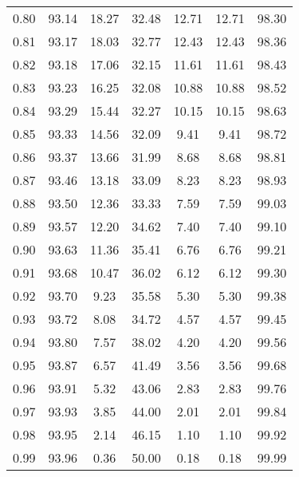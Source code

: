 \begin{tabular}{|c|c|c|c|c|c|c|}
      0.80 &     93.14 &     18.27 &      32.48 &   12.71 &      12.71 &         98.30 \\
      0.81 &     93.17 &     18.03 &      32.77 &   12.43 &      12.43 &         98.36 \\
      0.82 &     93.18 &     17.06 &      32.15 &   11.61 &      11.61 &         98.43 \\
      0.83 &     93.23 &     16.25 &      32.08 &   10.88 &      10.88 &         98.52 \\
      0.84 &     93.29 &     15.44 &      32.27 &   10.15 &      10.15 &         98.63 \\
      0.85 &     93.33 &     14.56 &      32.09 &    9.41 &       9.41 &         98.72 \\
      0.86 &     93.37 &     13.66 &      31.99 &    8.68 &       8.68 &         98.81 \\
      0.87 &     93.46 &     13.18 &      33.09 &    8.23 &       8.23 &         98.93 \\
      0.88 &     93.50 &     12.36 &      33.33 &    7.59 &       7.59 &         99.03 \\
      0.89 &     93.57 &     12.20 &      34.62 &    7.40 &       7.40 &         99.10 \\
      0.90 &     93.63 &     11.36 &      35.41 &    6.76 &       6.76 &         99.21 \\
      0.91 &     93.68 &     10.47 &      36.02 &    6.12 &       6.12 &         99.30 \\
      0.92 &     93.70 &      9.23 &      35.58 &    5.30 &       5.30 &         99.38 \\
      0.93 &     93.72 &      8.08 &      34.72 &    4.57 &       4.57 &         99.45 \\
      0.94 &     93.80 &      7.57 &      38.02 &    4.20 &       4.20 &         99.56 \\
      0.95 &     93.87 &      6.57 &      41.49 &    3.56 &       3.56 &         99.68 \\
      0.96 &     93.91 &      5.32 &      43.06 &    2.83 &       2.83 &         99.76 \\
      0.97 &     93.93 &      3.85 &      44.00 &    2.01 &       2.01 &         99.84 \\
      0.98 &     93.95 &      2.14 &      46.15 &    1.10 &       1.10 &         99.92 \\
      0.99 &     93.96 &      0.36 &      50.00 &    0.18 &       0.18 &         99.99 \\
\bottomrule
\end{tabular}
